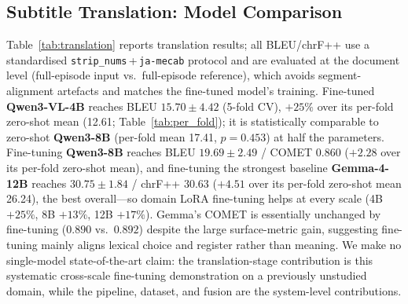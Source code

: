 \documentclass[mathematics,article,submit,xetex,moreauthors]{Definitions/mdpi}
\begin{document}
\subsection{Subtitle Translation: Model Comparison}
\label{sec:translation_results}
Table~\ref{tab:translation} reports translation results; all BLEU/chrF++ use a standardised \texttt{strip\_nums}\,+\,\allowbreak\texttt{ja-mecab} protocol and are evaluated at the document level (full-episode input vs.\ full-episode reference), which avoids segment-alignment artefacts and matches the fine-tuned model's training.
Fine-tuned \textbf{Qwen3-VL-4B} reaches BLEU $15.70\pm4.42$ (5-fold CV), $+25\%$ over its per-fold zero-shot mean (12.61; Table~\ref{tab:per_fold}); it is statistically comparable to zero-shot \textbf{Qwen3-8B} (per-fold mean 17.41, $p=0.453$) at half the parameters.
Fine-tuning \textbf{Qwen3-8B} reaches BLEU $19.69\pm2.49$ / COMET $0.860$ ($+2.28$ over its per-fold zero-shot mean), and fine-tuning the strongest baseline \textbf{Gemma-4-12B} reaches $30.75\pm1.84$ / chrF++ $30.63$ ($+4.51$ over its per-fold zero-shot mean 26.24), the best overall---so domain LoRA fine-tuning helps at every scale (4B $+25\%$, 8B $+13\%$, 12B $+17\%$).
Gemma's COMET is essentially unchanged by fine-tuning ($0.890$ vs.\ $0.892$) despite the large surface-metric gain, suggesting fine-tuning mainly aligns lexical choice and register rather than meaning.
We make no single-model state-of-the-art claim: the translation-stage contribution is this systematic cross-scale fine-tuning demonstration on a previously unstudied domain, while the pipeline, dataset, and fusion are the system-level contributions.
\end{document}
